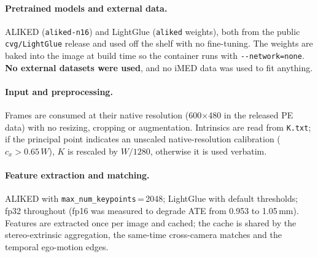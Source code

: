 \paragraph{Pretrained models and external data.} ALIKED (\texttt{aliked-n16}) and LightGlue
(\texttt{aliked} weights), both from the public \texttt{cvg/LightGlue} release and used off the shelf with
no fine-tuning. The weights are baked into the image at build time so the container runs with
\texttt{-{}-network=none}. \textbf{No external datasets were used}, and no iMED data was used to fit
anything.

\paragraph{Input and preprocessing.} Frames are consumed at their native resolution (600$\times$480 in the
released PE data) with no resizing, cropping or augmentation. Intrinsics are read from \texttt{K.txt};
if the principal point indicates an unscaled native-resolution calibration ($c_x > 0.65\,W$), $K$ is
rescaled by $W/1280$, otherwise it is used verbatim.

\paragraph{Feature extraction and matching.} ALIKED with \texttt{max\_num\_keypoints}\,=\,2048; LightGlue
with default thresholds; fp32 throughout (fp16 was measured to degrade ATE from 0.953 to 1.05\,mm).
Features are extracted once per image and cached; the cache is shared by the stereo-extrinsic aggregation,
the same-time cross-camera matches and the temporal ego-motion edges.


